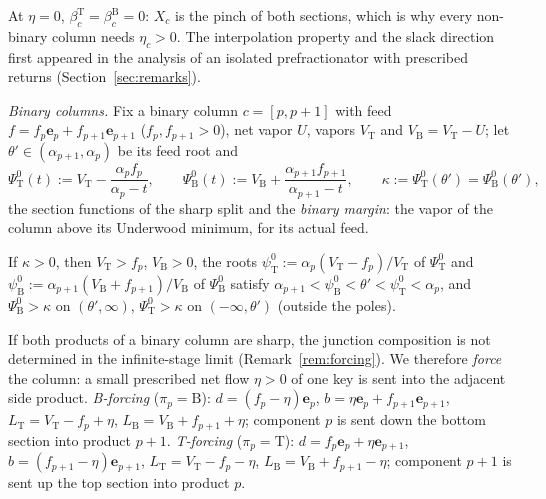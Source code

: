 \documentclass[11pt,a4paper]{report}
\newcommand{\bfe}{\mathbf e}
\newcommand{\Ts}{\mathrm T}
\newcommand{\Bs}{\mathrm B}
\begin{document}
At \(\eta=0\), \(\beta^\Ts_c=\beta^\Bs_c=0\): \(X_c\) is the pinch of both sections, which is why every non-binary column needs
\(\eta_c>0\). The interpolation property and the slack direction first appeared in the analysis of an isolated
prefractionator with prescribed returns (Section~\ref{sec:remarks}).

\emph{Binary columns.} Fix a binary column \(c=[p,p+1]\) with feed \(f=f_p\bfe_p+f_{p+1}\bfe_{p+1}\) (\(f_p,f_{p+1}>0\)), net vapor
\(U\), vapors \(V_\Ts\) and \(V_\Bs=V_\Ts-U\); let \(\theta'\in(\alpha_{p+1},\alpha_p)\) be its feed root and
\begin{equation}\label{eq:margin}
\Psi^0_\Ts(t):=V_\Ts-\frac{\alpha_pf_p}{\alpha_p-t},\qquad\Psi^0_\Bs(t):=V_\Bs+\frac{\alpha_{p+1}f_{p+1}}{\alpha_{p+1}-t},\qquad
\kappa:=\Psi^0_\Ts(\theta')=\Psi^0_\Bs(\theta'),
\end{equation}
the section functions of the sharp split and the \emph{binary margin}: the vapor of the column above its Underwood
minimum, for its actual feed.

\begin{proposition}\label{prop:sharpbinary}
If \(\kappa>0\), then \(V_\Ts>f_p\), \(V_\Bs>0\), the roots \(\psi^0_\Ts:=\alpha_p(V_\Ts-f_p)/V_\Ts\) of \(\Psi^0_\Ts\) and
\(\psi^0_\Bs:=\alpha_{p+1}(V_\Bs+f_{p+1})/V_\Bs\) of \(\Psi^0_\Bs\) satisfy \(\alpha_{p+1}<\psi^0_\Bs<\theta'<\psi^0_\Ts<\alpha_p\), and
\(\Psi^0_\Bs>\kappa\) on \((\theta',\infty)\), \(\Psi^0_\Ts>\kappa\) on \((-\infty,\theta')\) (outside the poles).
\end{proposition}

If both products of a binary column are sharp, the junction composition is not determined in the infinite-stage limit
(Remark~\ref{rem:forcing}). We therefore \emph{force} the column: a small prescribed net flow \(\eta>0\) of one key is sent
into the adjacent side product.
\emph{B-forcing} (\(\pi_p=\Bs\)): \(d=(f_p-\eta)\bfe_p\), \(b=\eta\bfe_p+f_{p+1}\bfe_{p+1}\), \(L_\Ts=V_\Ts-f_p+\eta\),
\(L_\Bs=V_\Bs+f_{p+1}+\eta\); component \(p\) is sent down the bottom section into product \(p+1\).
\emph{T-forcing} (\(\pi_p=\Ts\)): \(d=f_p\bfe_p+\eta\bfe_{p+1}\), \(b=(f_{p+1}-\eta)\bfe_{p+1}\), \(L_\Ts=V_\Ts-f_p-\eta\),
\(L_\Bs=V_\Bs+f_{p+1}-\eta\); component \(p+1\) is sent up the top section into product \(p\).
\end{document}
